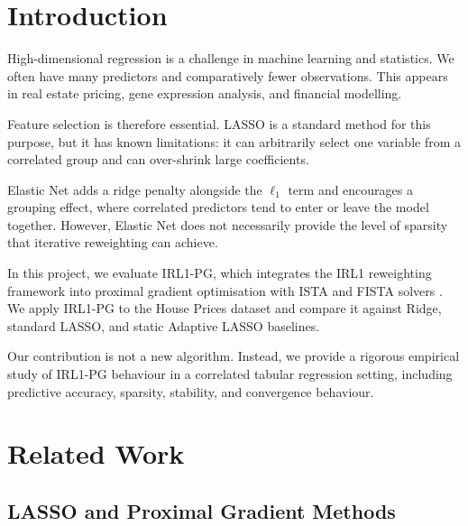 \documentclass[12pt,a4paper]{article}
\begin{document}
\section{Introduction}
\label{sec:intro}

High-dimensional regression is a challenge in machine learning and statistics. We often
have many predictors and comparatively fewer observations. This appears in real estate
pricing, gene expression analysis, and financial modelling.

Feature selection is therefore essential. LASSO is a standard method for this purpose,
but it has known limitations: it can arbitrarily select one variable from a correlated
group and can over-shrink large coefficients.

Elastic Net \citep{zouhastie2005} adds a ridge penalty alongside the $\ell_1$ term and
encourages a grouping effect, where correlated predictors tend to enter or leave the
model together. However, Elastic Net does not necessarily provide the level of sparsity
that iterative reweighting can achieve.

In this project, we evaluate IRL1-PG, which integrates the IRL1 reweighting framework
\citep{candes2008} into proximal gradient optimisation with ISTA and FISTA solvers
\citep{beck2009}. We apply IRL1-PG to the House Prices dataset and compare it against
Ridge, standard LASSO, and static Adaptive LASSO baselines.

Our contribution is not a new algorithm. Instead, we provide a rigorous empirical study
of IRL1-PG behaviour in a correlated tabular regression setting, including predictive
accuracy, sparsity, stability, and convergence behaviour.

\section{Related Work}
\label{sec:related}

\subsection{LASSO and Proximal Gradient Methods}
\end{document}
